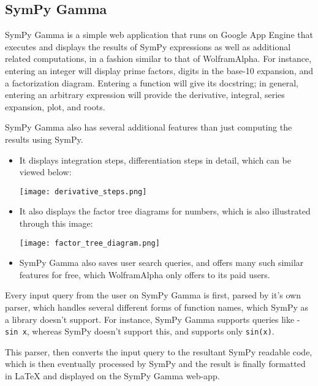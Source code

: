 \subsection{SymPy Gamma}\label{sympy-gamma}

SymPy Gamma is a simple web application that runs on Google App Engine 
that executes and displays the results of SymPy expressions as well as
additional related computations, in a fashion similar to that of
Wolfram\textbar{}Alpha. For instance, entering an integer will display
prime factors, digits in the base-10 expansion, and a factorization
diagram. Entering a function will give its docstring; in general,
entering an arbitrary expression will provide the derivative, integral,
series expansion, plot, and roots.

SymPy Gamma also has several additional features than just computing the
results using SymPy.

\begin{itemize}
\item
  It displays integration steps, differentiation steps in detail, which
  can be viewed below:\par
\begin{minipage}{\textwidth}
    \centering
    \texttt{[image: derivative\_steps.png]}
\end{minipage}
\item
  It also displays the factor tree diagrams for numbers, which is also
  illustrated through this image:\par
\begin{minipage}{\textwidth}
    \centering
    \texttt{[image: factor\_tree\_diagram.png]}
\end{minipage}
\item
  SymPy Gamma also saves user search queries, and offers many such 
  similar features for free, which Wolfram\textbar{}Alpha only offers 
  to its paid users.
\end{itemize}
Every input query from the user on SymPy Gamma is first, parsed by it's
own parser, which handles several different forms of function names,
which SymPy as a library doesn't support. For instance, SymPy Gamma
supports queries like - \texttt{sin\ x}, whereas SymPy doesn't support
this, and supports only \texttt{sin(x)}.

This parser, then converts the input query to the resultant SymPy
readable code, which is then eventually processed by SymPy and the
result is finally formatted in LaTeX and displayed on the SymPy Gamma
web-app.